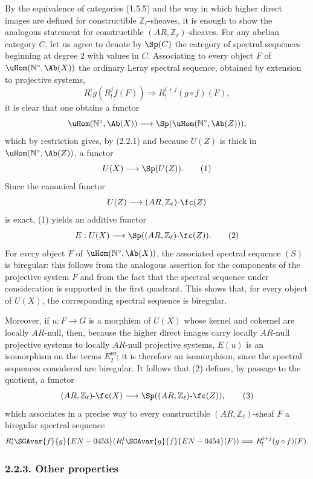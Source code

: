 \begin{prooftext}[Proof]
By the equivalence of categories (1.5.5) and the way in which higher direct images are defined for constructible \(\mathbb Z_\ell\)-sheaves, it is enough to show the analogous statement for constructible \((AR,\mathbb Z_\ell)\)-sheaves. For any abelian category \(C\), let us agree to denote by \(\Sp(C)\) the category of spectral sequences beginning at degree \(2\) with values in \(C\). Associating to every object \(F\) of \(\uHom(\mathbb N^\circ,\Ab(X))\) the ordinary Leray spectral sequence, obtained by extension to projective systems,
\[
R^i_! g(R^j_! f(F))\Longrightarrow R^{i+j}_!(g\circ f)(F),
\tag{S}
\]
it is clear that one obtains a functor
\[
\uHom(\mathbb N^\circ,\Ab(X))\longrightarrow \Sp(\uHom(\mathbb N^\circ,\Ab(Z))),
\]
which by restriction gives, by (2.2.1) and because \(U(Z)\) is thick in \(\uHom(\mathbb N^\circ,\Ab(Z))\), a functor
\[
U(X)\longrightarrow \Sp(U(Z)).
\tag{1}
\]
Since the canonical functor
\[
U(Z)\longrightarrow (AR,\mathbb Z_\ell)\text{-}\fc(Z)
\]
is exact, (1) yields an additive functor
\[
E:U(X)\longrightarrow \Sp((AR,\mathbb Z_\ell)\text{-}\fc(Z)).
\tag{2}
\]
For every object \(F\) of \(\uHom(\mathbb N^\circ,\Ab(X))\), the associated spectral sequence \((S)\) is biregular: this follows from the analogous assertion for the components of the projective system \(F\) and from the fact that the spectral sequence under consideration is supported in the first quadrant. This shows that, for every object of \(U(X)\), the corresponding spectral sequence is biregular.

Moreover, if \(u:F\to G\) is a morphism of \(U(X)\) whose kernel and cokernel are locally \(AR\)-null, then, because the higher direct images carry locally \(AR\)-null projective systems to locally \(AR\)-null projective systems, \(E(u)\) is an isomorphism on the terms \(E_2^{pq}\); it is therefore an isomorphism, since the spectral sequences considered are biregular. It follows that (2) defines, by passage to the quotient, a functor
\[
(AR,\mathbb Z_\ell)\text{-}\fc(X)
\longrightarrow \Sp((AR,\mathbb Z_\ell)\text{-}\fc(Z)),
\tag{3}
\]
which associates in a precise way to every constructible \((AR,\mathbb Z_\ell)\)-sheaf \(F\) a biregular spectral sequence
\[
R^i_!\SGAvar{f}{g}{EN-0453}(R^j_!\SGAvar{g}{f}{EN-0454}(F))\Longrightarrow R^{i+j}_!(g\circ f)(F).
\]
\end{prooftext}

\subsubsection*{2.2.3. Other properties}

